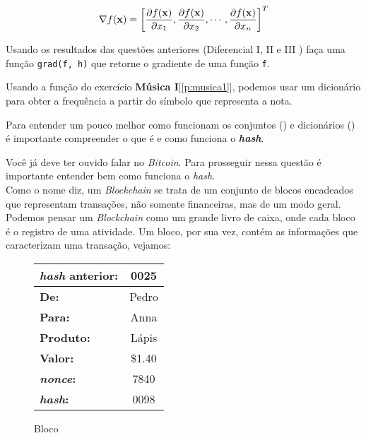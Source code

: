 \documentclass[12pt]{article}
\begin{document}
	$$\nabla f(\mathbf{x}) = \left[
	\frac{\partial f(\mathbf{x})}{\partial x_1},
	\frac{\partial f(\mathbf{x})}{\partial x_2},
	\cdots,
	\frac{\partial f(\mathbf{x})}{\partial x_n}
	\right]^{T}$$
	
	\quest Usando os resultados das questões anteriores (Diferencial I, II e III ) faça uma função \texttt{grad(f, h)} que retorne o gradiente de uma função \texttt{f}.
	
	
	
	
	
	
	
	
	
	Usando a função do exercício \textbf{Música I}[\ref{p:musica1}], podemos usar um dicionário para obter a frequência a partir do símbolo que representa a nota.


	\begin{interlude}{ \incomplete \label{i:hash}}
		
	Para entender um pouco melhor como funcionam os conjuntos () e dicionários () é importante compreender o que é e como funciona o \textit{\textbf{hash}}.
	
	
	
	\end{interlude}	
	
	\label{p:blockchain}
	
	Você já deve ter ouvido falar no \textit{Bitcoin}. Para prosseguir nessa questão é importante entender bem como funciona o \textit{hash}.\\
	
	Como o nome diz, um \textit{Blockchain} se trata de um conjunto de blocos encadeados que representam transações, não somente financeiras, mas de um modo geral. Podemos pensar um \textit{Blockchain} como um grande livro de caixa, onde cada bloco é o registro de uma atividade. Um bloco, por sua vez, contém as informações que caracterizam uma transação, vejamos:
	
	\begin{figure}[H]
		\centering
		\begin{tabular}{|lc|}
		\hline
		\textbf{\textit{hash} anterior:} & 0025\\
		\hline
		\textbf{De:} & Pedro \\
		\hline
		\textbf{Para:} & Anna \\
		\hline
		\textbf{Produto:} & Lápis \\
		\hline	
		\textbf{Valor:} & \$1.40 \\
		\hline
		\textbf{\textit{nonce}:} & 7840 \\
		\hline
		\textbf{\textit{hash}:} & 0098  \\
		\hline
		\end{tabular}
		\label{fig:blockchain}
		\caption{Bloco}
	\end{figure}
	
\end{document}
